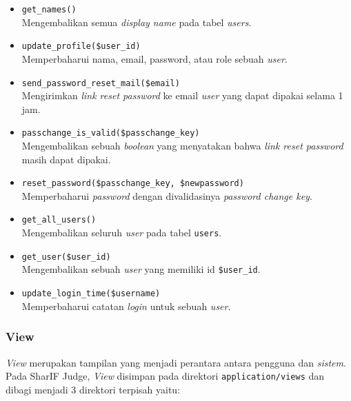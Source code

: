 \begin{itemize}
\begin{itemize}
		      \item \verb|get_names()| \\
		            Mengembalikan semua \textit{display name} pada tabel \textit{users}.
		      \item \verb|update_profile($user_id)| \\
		            Memperbaharui nama, email, password, atau role sebuah \textit{user}.
		      \item \verb|send_password_reset_mail($email)| \\
		            Mengirimkan \textit{link reset password} ke email \textit{user} yang dapat dipakai selama 1 jam.
		      \item \verb|passchange_is_valid($passchange_key)| \\
		            Mengembalikan sebuah \textit{boolean} yang menyatakan bahwa \textit{link reset password} masih dapat dipakai.
		      \item \verb|reset_password($passchange_key, $newpassword)| \\
		            Memperbaharui \textit{password} dengan divalidasinya \textit{password change key}.
		      \item \verb|get_all_users()| \\
		            Mengembalikan seluruh \textit{user} pada tabel \verb|users|.
		      \item \verb|get_user($user_id)| \\
		            Mengembalikan sebuah \textit{user} yang memiliki id \verb|$user_id|.
		      \item \verb|update_login_time($username)| \\
		            Memperbaharui catatan \textit{login} untuk sebuah \textit{user}.
	      \end{itemize}
\end{itemize}

\subsubsection{View}
\label{sub:3:1:1:view}

\textit{View} merupakan tampilan yang menjadi perantara antara pengguna dan \textit{sistem}. Pada SharIF Judge, \textit{View} disimpan pada direktori \verb|application/views| dan dibagi menjadi 3 direktori terpisah yaitu:

